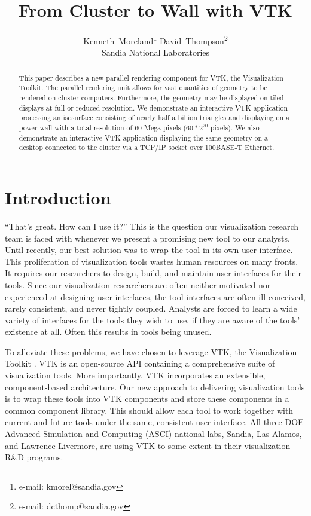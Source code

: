 \documentclass{acmsiggraph}
\title{From Cluster to Wall with VTK}
\author{Kenneth~Moreland\thanks{e-mail: kmorel@sandia.gov} \hspace{.2in}
  David~Thompson\thanks{e-mail: dcthomp@sandia.gov}
  \\ Sandia National Laboratories}
\begin{document}
  \maketitle

  \begin{abstract}
    This paper describes a new parallel rendering component for VTK, the
    Visualization Toolkit.  The parallel rendering unit allows for vast
    quantities of geometry to be rendered on cluster computers.
    Furthermore, the geometry may be displayed on tiled displays at full or
    reduced resolution.  We demonstrate an interactive VTK application
    processing an isosurface consisting of nearly half a billion triangles
    and displaying on a power wall with a total resolution of 60
    Mega-pixels ($60*2^{20}$ pixels).  We also demonstrate an interactive
    VTK application displaying the same geometry on a desktop connected to
    the cluster via a TCP/IP socket over 100BASE-T Ethernet.
  \end{abstract}

  \begin{CRcatlist}
  \end{CRcatlist}

  \keywordlist

  \copyrightspace

  \section{Introduction}
  \label{sec:introduction}

  ``That's great.  How can I use it?''  This is the question our
  visualization research team is faced with whenever we present a promising
  new tool to our analysts.  Until recently, our best solution was to wrap
  the tool in its own user interface.  This proliferation of visualization
  tools wastes human resources on many fronts.  It requires our researchers
  to design, build, and maintain user interfaces for their tools.  Since
  our visualization researchers are often neither motivated nor experienced
  at designing user interfaces, the tool interfaces are often
  ill-conceived, rarely consistent, and never tightly coupled.  Analysts
  are forced to learn a wide variety of interfaces for the tools they wish
  to use, if they are aware of the tools' existence at all.  Often this
  results in tools being unused.

  To alleviate these problems, we have chosen to leverage VTK, the
  Visualization Toolkit \cite{Schroeder98}.  VTK is an open-source API
  containing a comprehensive suite of visualization tools.  More
  importantly, VTK incorporates an extensible, component-based
  architecture.  Our new approach to delivering visualization tools is to
  wrap these tools into VTK components and store these components in a
  common component library.  This should allow each tool to work together
  with current and future tools under the same, consistent user interface.
  All three DOE Advanced Simulation and Computing (ASCI) national labs,
  Sandia, Las Alamos, and Lawrence Livermore, are using VTK to some extent
  in their visualization R\&D programs.
\end{document}
